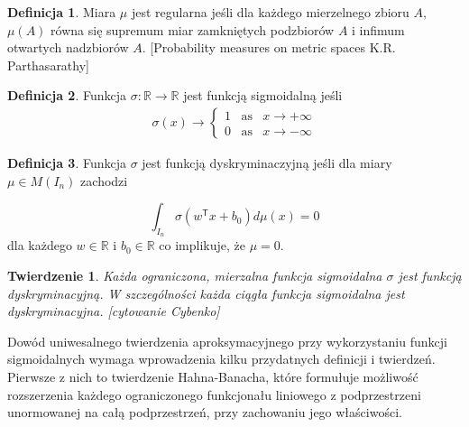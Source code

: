 \documentclass[]{article}
\newtheorem{theorem}{Twierdzenie}[section]
\theoremstyle{definition}
\newtheorem{definition}{Definicja}[section]
\begin{document}
\begin{definition}
Miara $\mu$ jest regularna jeśli dla każdego mierzelnego zbioru $A$, $\mu(A)$ równa się supremum miar zamkniętych podzbiorów $A$ i infimum otwartych nadzbiorów $A$. [Probability measures on metric spaces K.R. Parthasarathy]	
\end{definition}
 
 
% 
% 

\begin{definition}
	Funkcja $\sigma: \mathbb{R} \rightarrow \mathbb{R}$ jest funkcją sigmoidalną jeśli
	\begin{eqnarray*}
		\sigma(x) \rightarrow \begin{cases} 1 \;\;\;\text{as} &x \rightarrow +\infty\\ 0 \;\;\;\text{as} &x \rightarrow -\infty\end{cases}
	\end{eqnarray*}
	
\end{definition}



\begin{definition}
Funkcja $\sigma$ jest funkcją dyskryminaczyjną jeśli dla miary $\mu \in M(I_n)$ zachodzi 

\begin{equation}
\int_{I_n} \sigma \left( w^\mathsf{T}x + b_0 \right) d\mu(x) = 0
\end{equation}
dla każdego $w\in \mathbb{R}$ i $b_0 \in \mathbb{R}$ co implikuje, że $\mu = 0$.
	
\end{definition}


\begin{theorem}
Każda ograniczona, mierzalna funkcja sigmoidalna $\sigma$ jest funkcją dyskryminacyjną. W szczególności każda ciągła funkcja sigmoidalna jest dyskryminacyjna.
[cytowanie Cybenko]
\end{theorem}

Dowód uniwesalnego twierdzenia aproksymacyjnego przy wykorzystaniu funkcji sigmoidalnych wymaga wprowadzenia kilku przydatnych definicji i twierdzeń. Pierwsze z nich to twierdzenie Hahna-Banacha, które formułuje możliwość rozszerzenia każdego ograniczonego funkcjonału liniowego z podprzestrzeni unormowanej na całą podprzestrzeń, przy zachowaniu jego właściwości.
\end{document}
